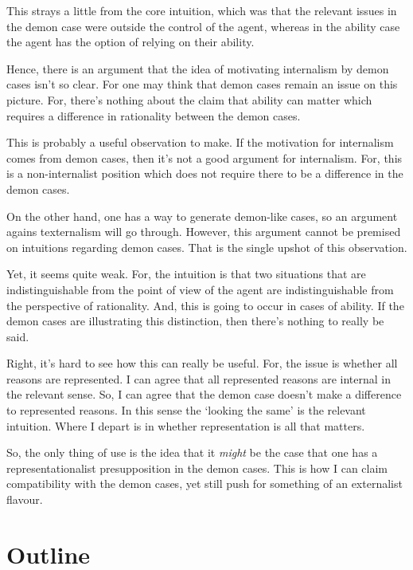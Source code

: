 \documentclass[10pt]{article}
\newcommand{\hozlinedash}[0]{%
  \noindent\hdashrule[0.5ex][c]{\textwidth}{.1pt}{2.5pt}
}
\begin{document}
This strays a little from the core intuition, which was that the relevant issues in the demon case were outside the control of the agent, whereas in the ability case the agent has the option of relying on their ability.

Hence, there is an argument that the idea of motivating internalism by demon cases isn't so clear.
For one may think that demon cases remain an issue on this picture.
For, there's nothing about the claim that ability can matter which requires a difference in rationality between the demon cases.

This is probably a useful observation to make.
If the motivation for internalism comes from demon cases, then it's not a good argument for internalism.
For, this is a non-internalist position which does not require there to be a difference in the demon cases.

On the other hand, one has a way to generate demon-like cases, so an argument agains texternalism will go through.
However, this argument cannot be premised on intuitions regarding demon cases.
That is the single upshot of this observation.

Yet, it seems quite weak.
For, the intuition is that two situations that are indistinguishable from the point of view of the agent are indistinguishable from the perspective of rationality.
And, this is going to occur in cases of ability.
If the demon cases are illustrating this distinction, then there's nothing to really be said.

Right, it's hard to see how this can really be useful.
For, the issue is whether all reasons are represented.
I can agree that all represented reasons are internal in the relevant sense.
So, I can agree that the demon case doesn't make a difference to represented reasons.
In this sense the `looking the same' is the relevant intuition.
Where I depart is in whether representation is all that matters.

So, the only thing of use is the idea that it \emph{might} be the case that one has a representationalist presupposition in the demon cases.
This is how I can claim compatibility with the demon cases, yet still push for something of an externalist flavour.

\hozlinedash


\section*{Outline}
\label{sec:outline}
\end{document}
